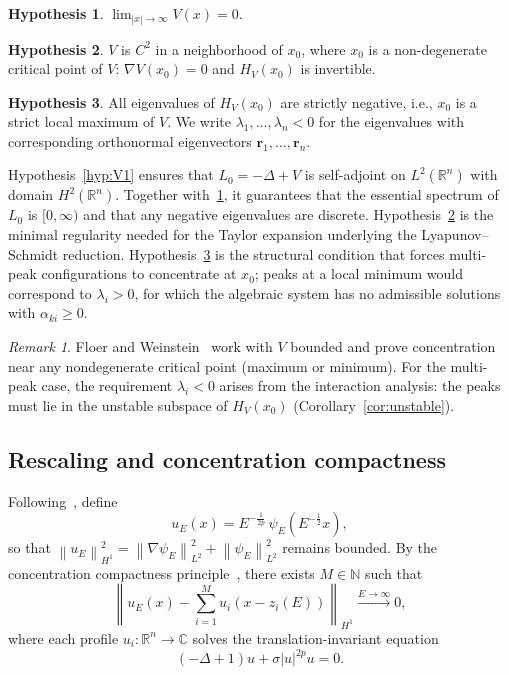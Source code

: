 \documentclass[11pt]{article}
\theoremstyle{plain}%
\theoremstyle{definition}%
\theoremstyle{definition}%
\newtheorem{hyp}{Hypothesis}%
\theoremstyle{remark}%
\newtheorem{rmk}[thm]{Remark}%
\numberwithin{equation}{section}
\newcommand{\R}{\mathbb{R}}
\newcommand{\C}{\mathbb{C}}
\newcommand{\N}{\mathbb{N}}
\newcommand{\HV}{H_V}
\newcommand{\norm}[1]{\left\| #1 \right\|}
\begin{document}
\begin{hyp}\label{hyp:V2}
$\displaystyle\lim_{|x|\to\infty} V(x) = 0$.
\end{hyp}

\begin{hyp}\label{hyp:V3}
$V$ is $C^2$ in a neighborhood of $x_0$, where $x_0$ is a non-degenerate critical point of $V$: $\nabla V(x_0)=0$ and $\HV(x_0)$ is invertible.
\end{hyp}

\begin{hyp}\label{hyp:V4}
All eigenvalues of $\HV(x_0)$ are strictly negative, i.e., $x_0$ is a strict local maximum of $V$. We write $\lambda_1,\ldots,\lambda_n<0$ for the eigenvalues with corresponding orthonormal eigenvectors $\boldsymbol{r}_1,\ldots,\boldsymbol{r}_n$.
\end{hyp}

Hypothesis~\ref{hyp:V1} ensures that $L_0=-\Delta+V$ is self-adjoint on $L^2(\R^n)$ with domain $H^2(\R^n)$. Together with~\ref{hyp:V2}, it guarantees that the essential spectrum of $L_0$ is $[0,\infty)$ and that any negative eigenvalues are discrete. Hypothesis~\ref{hyp:V3} is the minimal regularity needed for the Taylor expansion underlying the Lyapunov--Schmidt reduction. Hypothesis~\ref{hyp:V4} is the structural condition that forces multi-peak configurations to concentrate at $x_0$; peaks at a local minimum would correspond to $\lambda_i>0$, for which the algebraic system has no admissible solutions with $\alpha_{ki}\geq 0$.

\begin{rmk}
Floer and Weinstein~\cite{FloerWeinstein1986} work with $V$ bounded and prove concentration near any nondegenerate critical point (maximum or minimum). For the multi-peak case, the requirement $\lambda_i<0$ arises from the interaction analysis: the peaks must lie in the unstable subspace of $\HV(x_0)$ (Corollary~\ref{cor:unstable}).
\end{rmk}


\subsection{Rescaling and concentration compactness}\label{subsec:rescaling}

Following~\cite{KirrNatarajan2018}, define
\begin{equation}\label{eq:rescaling}
u_E(x) = E^{-\frac{1}{2p}}\,\psi_E(E^{-\frac{1}{2}}x),
\end{equation}
so that $\norm{u_E}_{H^1}^2 = \norm{\nabla\psi_E}_{L^2}^2 + \norm{\psi_E}_{L^2}^2$ remains bounded. By the concentration compactness principle~\cite{Lions1984a}, there exists $M\in\N$ such that
\begin{equation}\label{eq:concentration}
\norm{u_E(x) - \sum_{i=1}^{M} u_i(x-z_i(E))}_{H^1} \xrightarrow{E\to\infty} 0,
\end{equation}
where each profile $u_i:\R^n\to\C$ solves the translation-invariant equation
\begin{equation}\label{eq:profile}
(-\Delta+1)u + \sigma|u|^{2p}u = 0.
\end{equation}
\end{document}
